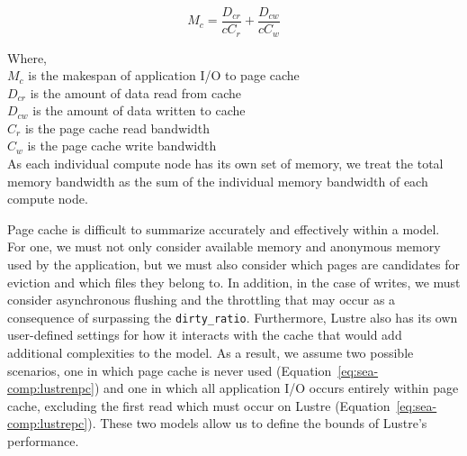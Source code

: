       \begin{equation}\label{eq:sea-comp:cache}
          M_{c} = \frac{D_{cr}}{cC_{r}} + \frac{D_{cw}}{cC_{w}}
      \end{equation}

      Where, \\
      $M_{c}$ is the makespan of application I/O to page cache \\
      $D_{cr}$ is the amount of data read from cache \\
      $D_{cw}$ is the amount of data written to cache \\
      $C_{r}$ is the page cache read bandwidth \\
      $C_{w}$ is the page cache write bandwidth \\ 


    


       As each individual compute node has its own set of memory, we treat the
      total memory bandwidth as the sum of the individual memory bandwidth of
      each compute node.


      Page cache is difficult to summarize accurately and effectively within a
      model. For one, we must not only consider available memory and anonymous
      memory used by the application, but we must also consider which pages are
      candidates for eviction and which files they belong to. In addition, in
      the case of writes, we must consider asynchronous flushing and the
      throttling that may occur as a consequence of surpassing the
      \texttt{dirty\_ratio}. Furthermore, Lustre also has its own user-defined
      settings for how it interacts with the cache that would add additional
      complexities to the model. As a result, we assume two possible scenarios,
      one in which page cache is never used
      (Equation~\ref{eq:sea-comp:lustrenpc}) and one in which all application
      I/O occurs entirely within page cache, excluding the first read which must
      occur on Lustre (Equation~\ref{eq:sea-comp:lustrepc}). These two models
      allow us to define the bounds of Lustre's performance.

